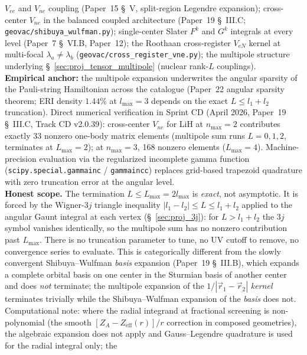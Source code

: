 \documentclass[11pt]{article}
\begin{document}
$V_{ee}$ and $V_{ne}$ coupling (Paper~15 \S~V, split-region Legendre
expansion); cross-center $V_{ne}$ in the balanced coupled architecture
(Paper~19 \S~III.C; \texttt{geovac/shibuya\_wulfman.py}); single-center
Slater $F^k$ and $G^k$ integrals at every level (Paper~7 \S~VI.B,
Paper~12); the Roothaan cross-register $V_{eN}$ kernel at multi-focal
$\lambda_a \ne \lambda_b$ (\texttt{geovac/cross\_register\_vne.py});
the multipole structure underlying \S~\ref{sec:proj_tensor_multipole}
(nuclear rank-$L$ couplings).\\
\textbf{Empirical anchor:} the multipole expansion underwrites the
angular sparsity of the Pauli-string Hamiltonian across the catalogue
(Paper~22 angular sparsity theorem; ERI density $1.44\%$ at
$l_\text{max} = 3$ depends on the exact $L \leq l_1 + l_2$
truncation).  Direct numerical verification in Sprint CD (April 2026,
Paper~19 \S~III.C, Track CD v2.0.39): cross-center $V_{ne}$ for LiH at
$n_\text{max} = 2$ contributes exactly 33 nonzero one-body matrix
elements (multipole sum runs $L = 0, 1, 2$, terminates at $L_\text{max}
= 2$); at $n_\text{max} = 3$, 168 nonzero elements ($L_\text{max} =
4$).  Machine-precision evaluation via the regularized incomplete
gamma function (\texttt{scipy.special.gammainc} / \texttt{gammaincc})
replaces grid-based trapezoid quadrature with zero truncation error at
the angular level.\\
\textbf{Honest scope.}  The termination $L \leq L_\text{max} =
2 l_\text{max}$ is \emph{exact}, not asymptotic.  It is forced by the
Wigner-$3j$ triangle inequality $|l_1 - l_2| \leq L \leq l_1 + l_2$
applied to the angular Gaunt integral at each vertex
(\S~\ref{sec:proj_3j}): for $L > l_1 + l_2$ the $3j$ symbol vanishes
identically, so the multipole sum has no nonzero contribution past
$L_\text{max}$.  There is no truncation parameter to tune, no UV
cutoff to remove, no convergence series to evaluate.  This is
categorically different from the slowly convergent Shibuya--Wulfman
\emph{basis} expansion (Paper~19 \S~III.B), which expands a complete
orbital basis on one center in the Sturmian basis of another center
and does \emph{not} terminate; the multipole expansion of the
$1/|\vec{r}_1 - \vec{r}_2|$ \emph{kernel} terminates trivially while
the Shibuya--Wulfman expansion of the \emph{basis} does not.
Computational note: where the radial integrand at fractional screening
is non-polynomial (the smooth $[Z_A - Z_\text{eff}(r)]/r$ correction
in composed geometries), the algebraic expansion does not apply and
Gauss--Legendre quadrature is used for the radial integral only; the
\end{document}
